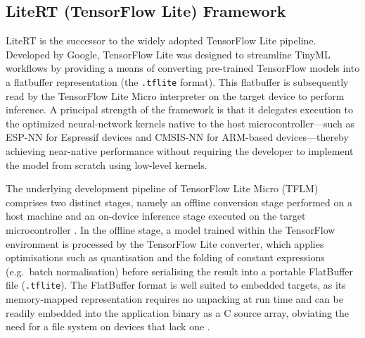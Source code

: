 \documentclass[12pt,DIV16,BCOR12mm,a4paper,footinclude=false,headinclude,parskip=half-,twoside,openright,cleardoublepage=empty,toc=index,bibliography=totoc,listof=totoc]{scrreprt}
\numberwithin{equation}{chapter}
\begin{document}
  \subsection{LiteRT (TensorFlow Lite) Framework}
  \label{sec:impl}
  LiteRT is the successor to the widely adopted TensorFlow Lite pipeline. Developed
  by Google, TensorFlow Lite was designed to streamline TinyML workflows by
  providing a means of converting pre-trained TensorFlow models into a flatbuffer
  representation (the \texttt{.tflite} format). This flatbuffer is subsequently read
  by the TensorFlow Lite Micro interpreter on the target device to perform
  inference. A principal strength of the framework is that it delegates execution to
  the optimized neural-network kernels native to the host microcontroller---such as
  ESP-NN for Espressif devices and CMSIS-NN for ARM-based devices---thereby
  achieving near-native performance without requiring the developer to implement the
  model from scratch using low-level kernels.

  The underlying development pipeline of TensorFlow Lite Micro (TFLM) comprises two
  distinct stages, namely an offline conversion stage performed on a host machine and
  an on-device inference stage executed on the target microcontroller
  \cite{davidTensorFlowLiteMicro2021}. In the offline stage, a model trained within
  the TensorFlow environment is processed by the TensorFlow Lite converter, which
  applies optimisations such as quantisation and the folding of constant expressions
  (e.g.\ batch normalisation) before serialising the result into a portable FlatBuffer
  file (\texttt{.tflite}). The FlatBuffer format is well suited to embedded targets, as
  its memory-mapped representation requires no unpacking at run time and can be readily
  embedded into the application binary as a C source array, obviating the need for a
  file system on devices that lack one \cite{davidTensorFlowLiteMicro2021}.
\end{document}
